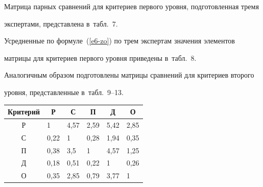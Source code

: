       Матрица парных сравнений для критериев первого уровня, подготовленная тремя 

экспертами, представлена в~табл.~7.

      

      Усредненные по формуле~(\ref{e6-zo}) по трем экспертам значения элементов 

матрицы для критериев первого уровня приведены в~табл.~8.

      



      

      Аналогичным образом подготовлены матрицы сравнений для критериев второго 

уровня, представленные в~табл.~9--13.

\begin{table}\small %

\vspace*{-3pt}

\begin{center}

\parbox{240pt}{

}



\vspace*{2ex}



\tabcolsep=9.1pt

\begin{tabular}{|c|l|l|l|l|l|}

\hline

Критерий&\multicolumn{1}{c|}{Р}&\multicolumn{1}{c|}{С}&\multicolumn{1}{c|}{П}&\multicolumn{1}{c|}{Д}&\multicolumn{1}{c|}{О}\\

\hline

Р&1&4,57&2,59&5,42&2,85\\

С&0,22&1&0,28&1,94&0,35\\

П&0,38&3,5&1&4,57&1,25\\

Д&0,18&0,51&0,22&1&0,26\\

О&0,35&2,85&0,79&3,77&1\\

\hline

\end{tabular}


\end{center}
\end{table}
